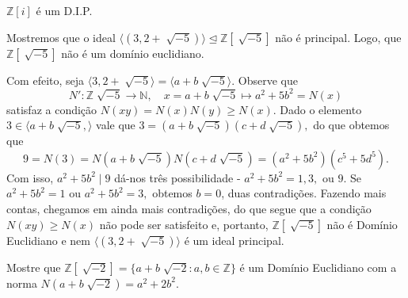 \documentclass[algebraII_notes.tex]{subfiles}
\begin{document}
\begin{crl*}
	\(\mathbb{Z}[i]\) é um D.I.P.
\end{crl*}
\begin{example}
	Mostremos que o ideal \(\langle (3, 2 + \sqrt[]{-5}) \rangle \trianglelefteq{\mathbb{Z}[\sqrt[]{-5}]}\) não é principal. Logo, que
	\(\mathbb{Z}[\sqrt[]{-5}]\) não é um domínio euclidiano.

	Com efeito, seja \(\langle 3, 2 + \sqrt[]{-5} \rangle = \langle a + b\sqrt[]{-5} \rangle.\) Observe que
	\[
		N':\mathbb{Z}\sqrt[]{-5}\rightarrow \mathbb{N},\quad x = a+b\sqrt[]{-5}\mapsto a^{2}+5b^{2} = N(x)
	\]
	satisfaz a condição \(N(xy) = N(x)N(y)\geq N(x).\) Dado o elemento \(3\in \langle a + b\sqrt[]{-5}, \rangle\)
	vale que \(3 = (a+b\sqrt[]{-5})(c+d\sqrt[]{-5}),\) do que obtemos que
	\[
		9 = N(3) = N(a+b\sqrt[]{-5})N(c+d\sqrt[]{-5}) = (a^{2}+5b^{2})(c^{5}+5d^{5}).
	\]
	Com isso, \(a^{2}+5b^{2}\mid 9\) dá-nos três possibilidade - \(a^{2} + 5b^{2} = 1, 3,\text{ ou }9.\)
	Se \(a^{2} + 5b^{2} = 1\) ou \(a^{2} + 5b^{2} = 3,\) obtemos \(b = 0\), duas contradições. Fazendo mais contas,
	chegamos em ainda mais contradições, do que segue que a condição \(N(xy)\geq N(x)\) não pode ser satisfeito e, portanto,
	\(\mathbb{Z}[\sqrt[]{-5}]\) não é Domínio Euclidiano e nem \(\langle (3, 2+\sqrt[]{-5}) \rangle\) é um ideal principal.
\end{example}
\begin{example}[Exercício]
	Mostre que \(\mathbb{Z}[\sqrt[]{-2}] = \{a + b\sqrt[]{-2}: a, b\in \mathbb{Z}\}\) é um Domínio
	Euclidiano com a norma \(N(a+b\sqrt[]{-2}) = a^{2} + 2b^{2}.\)
\end{example}
\end{document}
